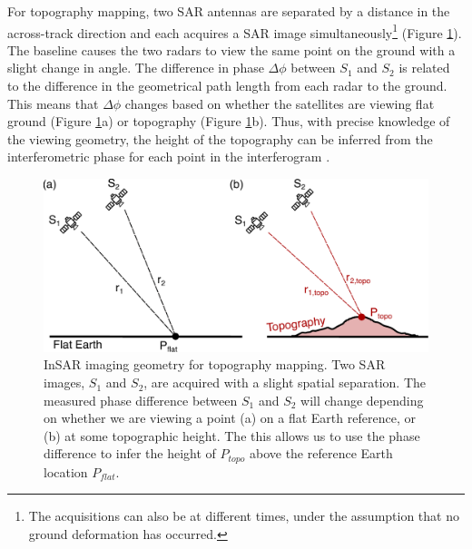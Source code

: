 For topography mapping, two SAR antennas are separated by a distance in the across-track direction and each acquires a SAR image simultaneously\footnote{The acquisitions can also be at different times, under the assumption that no ground deformation has occurred.} (Figure \ref{fig:ch3-insar-geometry-topo}). The baseline causes the two radars to view the same point on the ground with a slight change in angle.
The difference in phase $\Delta \phi$ between $S_1$ and $S_2$ is related to the difference in the geometrical path length from each radar to the ground.
This means that $\Delta \phi$ changes based on whether the satellites are viewing flat ground (Figure \ref{fig:ch3-insar-geometry-topo}a) or topography (Figure \ref{fig:ch3-insar-geometry-topo}b). Thus, with precise knowledge of the viewing geometry, the height of the topography can be inferred from the interferometric phase for each point in the interferogram \citep{Simons2007InterferometricSyntheticAperture}. 


\begin{figure}
	\centering
	\includegraphics[width=0.99\linewidth]{figures/chapter3-sar/ch3-insar-geometry-topo.pdf}
	\caption[InSAR imaging geometry for topography mapping]{InSAR imaging geometry for topography mapping. Two SAR images, $S_1$ and $S_2$, are acquired with a slight spatial separation. The measured phase difference between $S_1$ and $S_2$ will change depending on whether we are viewing a point (a) on a flat Earth reference, or (b) at some topographic height.
		 The this allows us to use the phase difference to infer the height of $P_{topo}$ above the reference Earth location $P_{flat}$.
	}
	\label{fig:ch3-insar-geometry-topo}
\end{figure}


